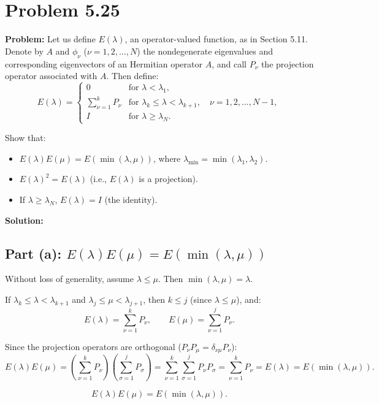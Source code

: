 \documentclass[12pt]{article}
\begin{document}
\section*{Problem 5.25}

\textbf{Problem:} Let us define $E(\lambda)$, an operator-valued function, as in Section 5.11. Denote by $A$ and $\phi_\nu$ ($\nu = 1, 2, \ldots, N$) the nondegenerate eigenvalues and corresponding eigenvectors of an Hermitian operator $A$, and call $P_\nu$ the projection operator associated with $A$. Then define:
\[
E(\lambda) = \begin{cases} 0 & \text{for } \lambda < \lambda_1, \\ \sum_{\nu=1}^{k} P_\nu & \text{for } \lambda_k \leq \lambda < \lambda_{k+1}, \quad \nu = 1, 2, \ldots, N-1, \\ I & \text{for } \lambda \geq \lambda_N. \end{cases}
\]

Show that:
\begin{itemize}
\item[(a)] $E(\lambda)E(\mu) = E(\min(\lambda, \mu))$, where $\lambda_{\min} = \min(\lambda_1, \lambda_2)$.
\item[(b)] $E(\lambda)^2 = E(\lambda)$ (i.e., $E(\lambda)$ is a projection).
\item[(c)] If $\lambda \geq \lambda_N$, $E(\lambda) = I$ (the identity).
\end{itemize}

\bigskip
\textbf{Solution:}

\subsection*{Part (a): $E(\lambda)E(\mu) = E(\min(\lambda,\mu))$}

Without loss of generality, assume $\lambda \leq \mu$. Then $\min(\lambda,\mu) = \lambda$.

If $\lambda_k \leq \lambda < \lambda_{k+1}$ and $\lambda_j \leq \mu < \lambda_{j+1}$, then $k \leq j$ (since $\lambda \leq \mu$), and:
\[
E(\lambda) = \sum_{\nu=1}^{k}P_\nu, \qquad E(\mu) = \sum_{\nu=1}^{j}P_\nu.
\]

Since the projection operators are orthogonal ($P_\nu P_\mu = \delta_{\nu\mu}P_\nu$):
\[
E(\lambda)E(\mu) = \left(\sum_{\nu=1}^{k}P_\nu\right)\left(\sum_{\sigma=1}^{j}P_\sigma\right) = \sum_{\nu=1}^{k}\sum_{\sigma=1}^{j}P_\nu P_\sigma = \sum_{\nu=1}^{k}P_\nu = E(\lambda) = E(\min(\lambda,\mu)).
\]

\[
\boxed{E(\lambda)E(\mu) = E(\min(\lambda,\mu)).}
\]
\end{document}
